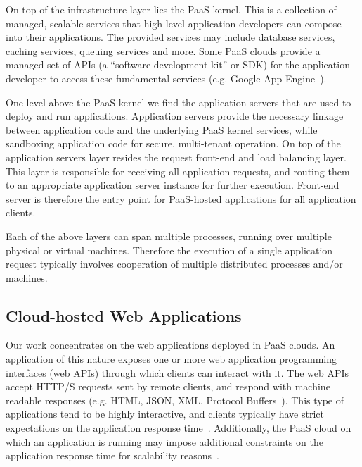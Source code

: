 On top of the infrastructure layer lies the PaaS kernel. This is a collection of managed, scalable
services that high-level application developers can compose into their applications. The provided services
may include database services, caching services, queuing services and more. Some PaaS clouds
provide a managed set of APIs (a ``software development
kit'' or SDK) for the application developer to access these fundamental services (e.g. Google App Engine~\cite{gae}). 

One level above the PaaS kernel we find the application servers that are used to deploy and run
applications. Application servers provide the necessary linkage between application code and the
underlying PaaS kernel services, while sandboxing application code for secure, multi-tenant operation. On top
of the application servers layer resides the request
front-end and load balancing layer. This layer is responsible
for receiving all application requests, and routing them to an appropriate application
server instance for further execution. Front-end server is therefore the entry point for PaaS-hosted
applications for all application clients.

Each of the above layers can span multiple processes, running over multiple physical or virtual
machines. Therefore the execution of a single application request typically involves cooperation
of multiple distributed processes and/or machines. 

\subsection{Cloud-hosted Web Applications} 


Our work concentrates on the web
applications deployed in PaaS clouds. An application of this nature exposes
one or more web application programming interfaces (web APIs) through which
clients can interact with it. The web APIs accept HTTP/S requests sent by
remote clients, and respond with machine readable responses (e.g. HTML, JSON,
XML, Protocol Buffers~\cite{protobuff}). This type of applications tend to be highly
interactive, and clients typically have strict expectations on the application
response time~\cite{latency-matters}.
Additionally, the PaaS cloud on
which an application is running may impose additional constraints on the
application response time for scalability
reasons~\cite{azure-limits,gae-limits}.  

